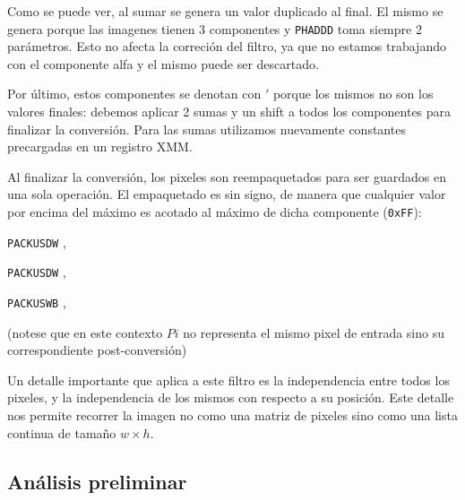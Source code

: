 Como se puede ver, al sumar se genera un valor duplicado al final. El mismo se genera porque las imagenes tienen 3 componentes y \texttt{PHADDD} toma siempre 2 parámetros. Esto no afecta la correción del filtro, ya que no estamos trabajando con el componente alfa y el mismo puede ser descartado.

Por último, estos componentes se denotan con $'$ porque los mismos no son los valores finales: debemos aplicar 2 sumas y un shift a todos los componentes para finalizar la conversión. Para las sumas utilizamos nuevamente constantes precargadas en un registro XMM.

Al finalizar la conversión, los pixeles son reempaquetados para ser guardados en una sola operación. El empaquetado es sin signo, de manera que cualquier valor por encima del máximo es acotado al máximo de dicha componente (\texttt{0xFF}):

\begin{center}
	 

	 

	 

	 

	\texttt{PACKUSDW} ,  \hfill

	 

	\texttt{PACKUSDW} ,  \hfill

	 

	\texttt{PACKUSWB} ,  \hfill

	 
\end{center}

(notese que en este contexto $Pi$ no representa el mismo pixel de entrada sino su correspondiente post-conversión)

Un detalle importante que aplica a este filtro es la independencia entre todos los pixeles, y la independencia de los mismos con respecto a su posición. Este detalle nos permite recorrer la imagen no como una matriz de pixeles sino como una lista continua de tamaño $w \times h$.

\subsection{Análisis preliminar}

